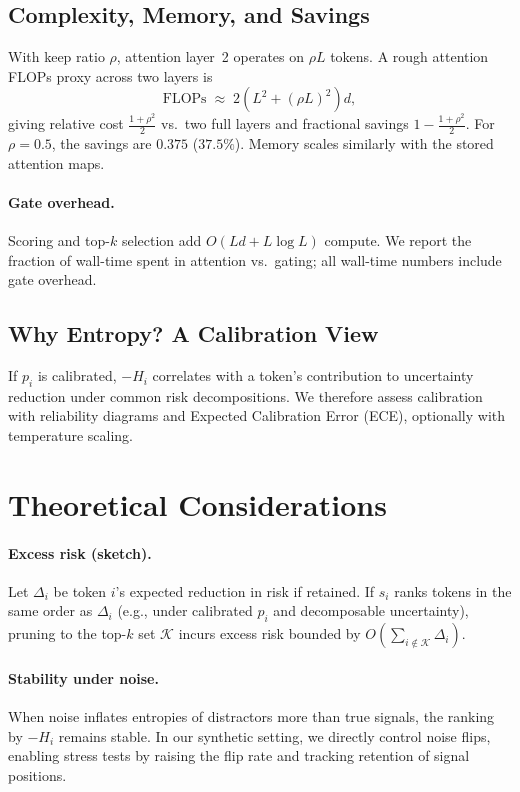 \documentclass{article}
\newcommand{\Lseq}{L}
\newcommand{\dmodel}{d}
\begin{document}
\subsection{Complexity, Memory, and Savings}
With keep ratio $\rho$, attention layer~2 operates on $\rho\Lseq$ tokens. A rough attention FLOPs proxy across two layers is
\begin{equation}
\mathrm{FLOPs} \;\approx\; 2\left(\Lseq^2 + (\rho\Lseq)^2\right)\dmodel,
\end{equation}
giving relative cost $\frac{1+\rho^2}{2}$ vs.\ two full layers and fractional savings $1 - \frac{1+\rho^2}{2}$. For $\rho=0.5$, the savings are $0.375$ ($37.5\%$). Memory scales similarly with the stored attention maps.

\paragraph{Gate overhead.}
Scoring and top-$k$ selection add $O(\Lseq \dmodel + \Lseq\log \Lseq)$ compute. We report the fraction of wall-time spent in attention vs.\ gating; all wall-time numbers include gate overhead.

\subsection{Why Entropy? A Calibration View}
If $p_i$ is calibrated, $-H_i$ correlates with a token’s contribution to uncertainty reduction under common risk decompositions. We therefore assess calibration with reliability diagrams and Expected Calibration Error (ECE), optionally with temperature scaling.

\section{Theoretical Considerations}
\label{sec:theory}
\paragraph{Excess risk (sketch).}
Let $\Delta_i$ be token $i$’s expected reduction in risk if retained. If $s_i$ ranks tokens in the same order as $\Delta_i$ (e.g., under calibrated $p_i$ and decomposable uncertainty), pruning to the top-$k$ set $\mathcal{K}$ incurs excess risk bounded by $O\!\left(\sum_{i\notin\mathcal{K}} \Delta_i\right)$.

\paragraph{Stability under noise.}
When noise inflates entropies of distractors more than true signals, the ranking by $-H_i$ remains stable. In our synthetic setting, we directly control noise flips, enabling stress tests by raising the flip rate and tracking retention of signal positions.
\end{document}
